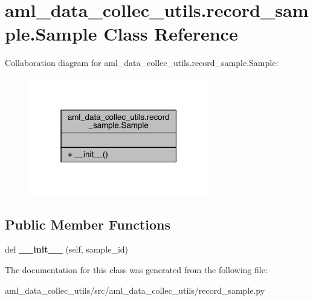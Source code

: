 \hypertarget{classaml__data__collec__utils_1_1record__sample_1_1_sample}{}\section{aml\+\_\+data\+\_\+collec\+\_\+utils.\+record\+\_\+sample.\+Sample Class Reference}
\label{classaml__data__collec__utils_1_1record__sample_1_1_sample}


Collaboration diagram for aml\+\_\+data\+\_\+collec\+\_\+utils.\+record\+\_\+sample.\+Sample\+:\nopagebreak
\begin{figure}[H]
\begin{center}
\leavevmode
\includegraphics[width=223pt]{classaml__data__collec__utils_1_1record__sample_1_1_sample__coll__graph}
\end{center}
\end{figure}
\subsection*{Public Member Functions}
\begin{DoxyCompactItemize}
\item 
\hypertarget{classaml__data__collec__utils_1_1record__sample_1_1_sample_aa41df0b8fc71b08189581fc9b3690ec2}{}\label{classaml__data__collec__utils_1_1record__sample_1_1_sample_aa41df0b8fc71b08189581fc9b3690ec2} 
def {\bfseries \+\_\+\+\_\+init\+\_\+\+\_\+} (self, sample\+\_\+id)
\end{DoxyCompactItemize}


The documentation for this class was generated from the following file\+:\begin{DoxyCompactItemize}
\item 
aml\+\_\+data\+\_\+collec\+\_\+utils/src/aml\+\_\+data\+\_\+collec\+\_\+utils/record\+\_\+sample.\+py\end{DoxyCompactItemize}
